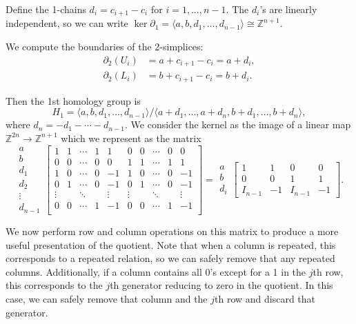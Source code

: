 \documentclass[12pt]{article}
\theoremstyle{definition}
\newcommand{\Z}{\mathbb{Z}}
\newcommand{\<}{\langle}
\renewcommand{\>}{\rangle}
\newcommand{\iso}{\cong}
\newcommand{\mat}[1]{\begin{bmatrix}#1\end{bmatrix}}
\newcommand{\bd}{\partial}
\begin{document}
Define the 1-chains $d_i = c_{i + 1} - c_i$ for $i = 1, \dots, n-1$.
The $d_i$'s are linearly independent, so we can write $\ker\bd_1 = \<a, b, d_1, \dots, d_{n-1}\> \iso \Z^{n+1}$.

We compute the boundaries of the 2-simplices:
\begin{align*}
    \bd_2(U_i) &= a + c_{i+1} - c_i = a + d_i, \\
    \bd_2(L_i) &= b + c_{i+1} - c_i = b + d_i.
\end{align*}

Then the 1st homology group is
\[
    H_1 = \<a, b, d_1, \dots, d_{n-1}\> / \<a + d_1, \dots, a + d_n, b + d_1, \dots, b + d_n\>,
\]
where $d_n = -d_1 - \cdots - d_{n-1}$.
We consider the kernel as the image of a linear map $\Z^{2n} \to \Z^{n+1}$ which we represent as the matrix
\[
    \begin{array}{c}
        a \\
        b \\
        d_1 \\
        d_2 \\
        \vdots \\
        d_{n-1}
    \end{array}
    \mat{
        1 & 1 & \cdots & 1 & 1 & 0 & 0 & \cdots & 0 & 0 \\
        0 & 0 & \cdots & 0 & 0 & 1 & 1 & \cdots & 1 & 1 \\
        1 & 0 & \cdots & 0 & -1 & 1 & 0 & \cdots & 0 & -1 \\
        0 & 1 & \cdots & 0 & -1 & 0 & 1 & \cdots & 0 & -1 \\ 
        \vdots & & \ddots & & \vdots & \vdots & & \ddots & & \vdots \\
        0 & 0 & \cdots & 1 & -1 & 0 & 0 & \cdots & 1 & -1 \\ 
    }
    =
    \begin{array}{c}
        a \\
        b \\
        d_i
    \end{array}
    \mat{
        1 & 1 & 0 & 0 \\
        0 & 0 & 1 & 1 \\
        I_{n-1} & -1 & I_{n-1} & -1
    }.
\]

We now perform row and column operations on this matrix to produce a more useful presentation of the quotient.
Note that when a column is repeated, this corresponds to a repeated relation, so we can safely remove that any repeated columns.
Additionally, if a column contains all 0's except for a 1 in the $j$th row, this corresponds to the $j$th generator reducing to zero in the quotient.
In this case, we can safely remove that column and the $j$th row and discard that generator.
\end{document}
